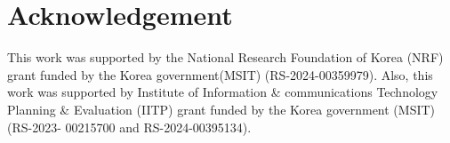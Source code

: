 \section*{Acknowledgement}

This work was supported by the National Research Foundation of Korea (NRF) grant funded by the Korea government(MSIT) (RS-2024-00359979). Also, this work was supported by Institute of Information \& communications Technology Planning \& Evaluation (IITP) grant funded by the Korea government (MSIT) (RS-2023-
00215700 and RS-2024-00395134).